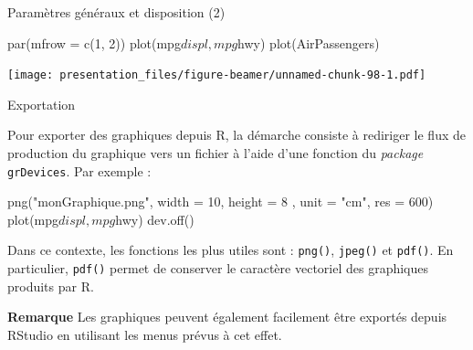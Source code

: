\documentclass[12pt,ignorenonframetext,handout,]{beamer}
\newenvironment{Shaded}{}{}
\newcommand{\DataTypeTok}[1]{#1}
\newcommand{\DecValTok}[1]{#1}
\newcommand{\KeywordTok}[1]{\textcolor[rgb]{0.00,0.00,1.00}{#1}}
\newcommand{\NormalTok}[1]{#1}
\newcommand{\OperatorTok}[1]{#1}
\newcommand{\StringTok}[1]{\textcolor[rgb]{0.00,0.50,0.50}{#1}}
\renewenvironment{Shaded}{\begin{snugshade}}{\end{snugshade}}
\newcommand{\intertitre}[1]{\textcolor{redInsee}{\textbf{#1}}}
\begin{document}
\begin{frame}[fragile]{Paramètres généraux et disposition (2)}
\protect\hypertarget{parametres-generaux-et-disposition-2}{}

\begin{Shaded}
\begin{Highlighting}[]
\KeywordTok{par}\NormalTok{(}\DataTypeTok{mfrow =} \KeywordTok{c}\NormalTok{(}\DecValTok{1}\NormalTok{, }\DecValTok{2}\NormalTok{))}
\KeywordTok{plot}\NormalTok{(mpg}\OperatorTok{$}\NormalTok{displ, mpg}\OperatorTok{$}\NormalTok{hwy)}
\KeywordTok{plot}\NormalTok{(AirPassengers)}
\end{Highlighting}
\end{Shaded}

\texttt{[image: presentation\_files/figure-beamer/unnamed-chunk-98-1.pdf]}

\end{frame}

\begin{frame}[fragile]{Exportation}
\protect\hypertarget{exportation}{}

Pour exporter des graphiques depuis R, la démarche consiste à rediriger
le flux de production du graphique vers un fichier à l’aide d’une
fonction du \emph{package} \texttt{grDevices}. Par exemple :

\pause

\begin{Shaded}
\begin{Highlighting}[]
\KeywordTok{png}\NormalTok{(}\StringTok{"monGraphique.png"}\NormalTok{, }\DataTypeTok{width =} \DecValTok{10}\NormalTok{, }\DataTypeTok{height =} \DecValTok{8}
\NormalTok{    , }\DataTypeTok{unit =} \StringTok{"cm"}\NormalTok{, }\DataTypeTok{res =} \DecValTok{600}\NormalTok{)}
\KeywordTok{plot}\NormalTok{(mpg}\OperatorTok{$}\NormalTok{displ, mpg}\OperatorTok{$}\NormalTok{hwy)}
\KeywordTok{dev.off}\NormalTok{()}
\end{Highlighting}
\end{Shaded}

\pause Dans ce contexte, les fonctions les plus utiles sont :
\texttt{png()}, \texttt{jpeg()} et \texttt{pdf()}. En particulier,
\texttt{pdf()} permet de conserver le caractère vectoriel des graphiques
produits par R.

\pause

\intertitre{Remarque} Les graphiques peuvent également facilement être
exportés depuis RStudio en utilisant les menus prévus à cet effet.

\end{frame}
\end{document}
